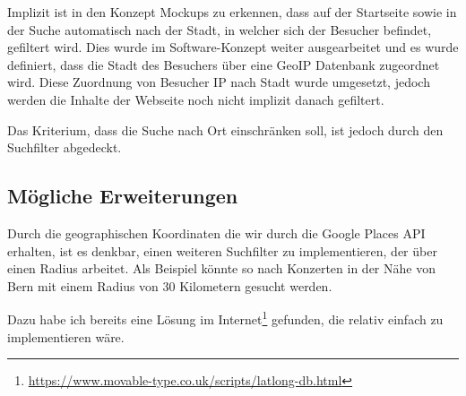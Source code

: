 Implizit ist in den Konzept Mockups zu erkennen, dass auf der Startseite sowie
in der Suche automatisch nach der Stadt, in welcher sich der Besucher befindet,
gefiltert wird. Dies wurde im Software-Konzept weiter ausgearbeitet und es wurde
definiert, dass die Stadt des Besuchers über eine GeoIP Datenbank zugeordnet wird.
Diese Zuordnung von Besucher IP nach Stadt wurde umgesetzt, jedoch werden die
Inhalte der Webseite noch nicht implizit danach gefiltert.

Das Kriterium, dass die Suche nach Ort einschränken soll, ist jedoch durch den
Suchfilter abgedeckt.

\clearpage
\subsection{Mögliche Erweiterungen}

Durch die geographischen Koordinaten die wir durch die Google Places API erhalten,
ist es denkbar, einen weiteren Suchfilter zu implementieren, der über einen Radius
arbeitet. Als Beispiel könnte so nach Konzerten in der Nähe von Bern mit einem
Radius von 30 Kilometern gesucht werden.

Dazu habe ich bereits eine Lösung im Internet\footnote{\url{https://www.movable-type.co.uk/scripts/latlong-db.html}}
gefunden, die relativ einfach zu implementieren wäre.
